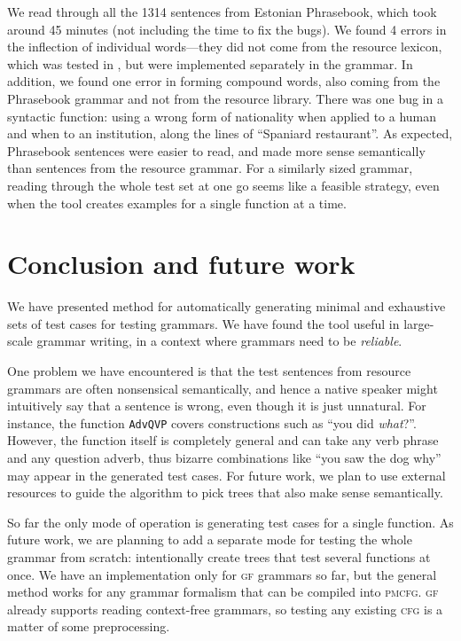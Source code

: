 \documentclass[11pt]{article}
\def\t#1{\texttt{#1}}
\def\gf{\textsc{gf}}
\def\cfg{\textsc{cfg}}
\def\pmcfg{\textsc{pmcfg}}
\begin{document}
We read through all the 1314 sentences from Estonian Phrasebook,
which took around 45 minutes (not including the time to fix the bugs).
We found 4 errors in the inflection of individual words---they did not
come from the resource lexicon, which was tested in
\cite{listenmaa_kaljurand2014}, but were implemented separately in the
grammar. In addition, we found one error in forming compound words,
also coming from the Phrasebook grammar and not from the resource
library. There was one bug in a syntactic function: using a wrong form
of nationality when applied to a human and when to an institution,
along the lines of ``Spaniard restaurant''. As expected, Phrasebook
sentences were easier to read, and made more sense semantically than
sentences from the resource grammar. For a similarly sized grammar,
reading through the whole test set at one go seems like a feasible
strategy, even when the tool creates examples for a single function at
a time.

\section{Conclusion and future work}

We have presented method for automatically generating minimal and exhaustive sets of test cases for testing grammars.  We have found the tool useful in large-scale grammar writing, in a context where grammars need to be \emph{reliable}.

One problem we have encountered is that the test sentences from
resource grammars are often nonsensical semantically, and hence a
native speaker might intuitively say that a sentence is wrong, even
though it is just unnatural. For instance, the function \t{AdvQVP}
covers constructions such as ``you did \emph{what}?''. However, the
function itself is completely general and can take any verb phrase and
any question adverb, thus  bizarre combinations like ``you saw the dog
why'' may appear in the generated test cases. For future work, we plan
to use external resources to guide the algorithm to pick trees that
also make sense semantically.

So far the only mode of operation is generating test cases for a
single function. As future work, we are planning to add a separate
mode for testing the whole grammar from scratch: intentionally create
trees that test several functions at once.
We have an implementation only for \gf{} grammars so far, but the
general method works for any grammar formalism that can be compiled
into \pmcfg{}. \gf{} already supports reading context-free grammars,
so testing any existing \cfg{} is a matter of some preprocessing. 




\end{document}
